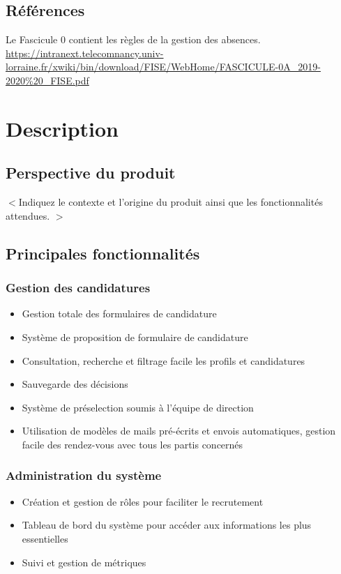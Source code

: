 \documentclass{scrreprt}
\begin{document}
\section{Références}

Le Fascicule 0 contient les règles de la gestion des absences.
\url{https://intranext.telecomnancy.univ-lorraine.fr/xwiki/bin/download/FISE/WebHome/FASCICULE-0A_2019-2020\%20_FISE.pdf}

\chapter{Description}
\section{Perspective du produit}
$<$Indiquez le contexte et l'origine du produit ainsi que les fonctionnalités attendues. $>$

\section{Principales fonctionnalités}

\subsection{Gestion des candidatures}
\begin{itemize}
    \item Gestion totale des formulaires de candidature
    \item Système de proposition de formulaire de candidature
    \item Consultation, recherche et filtrage facile les profils et candidatures
    \item Sauvegarde des décisions
    \item Système de préselection soumis à l'équipe de direction
    \item Utilisation de modèles de mails pré-écrits et envois automatiques, gestion facile des rendez-vous avec tous les partis concernés
\end{itemize}

\subsection{Administration du système}
\begin{itemize}
    \item Création et gestion de rôles pour faciliter le recrutement
    \item Tableau de bord du système pour accéder aux informations les plus essentielles
    \item Suivi et gestion de métriques
\end{itemize}
\end{document}
